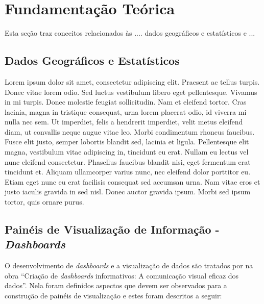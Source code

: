 \label{cap:revisao}

\section{Fundamentação Teórica} \textbf{ }

    Esta seção traz conceitos relacionados às .... dados geográficos e estatísticos e ...
    
    \subsection{Dados Geográficos e Estatísticos} \textbf{ } \newline

        Lorem ipsum dolor sit amet, consectetur adipiscing elit. Praesent ac tellus turpis. Donec vitae lorem odio. Sed luctus vestibulum libero eget pellentesque. Vivamus in mi turpis. Donec molestie feugiat sollicitudin. Nam et eleifend tortor. Cras lacinia, magna in tristique consequat, urna lorem placerat odio, id viverra mi nulla nec sem. Ut imperdiet, felis a hendrerit imperdiet, velit metus eleifend diam, ut convallis neque augue vitae leo. Morbi condimentum rhoncus faucibus. Fusce elit justo, semper lobortis blandit sed, lacinia et ligula. Pellentesque elit magna, vestibulum vitae adipiscing in, tincidunt eu erat. Nullam eu lectus vel nunc eleifend consectetur. Phasellus faucibus blandit nisi, eget fermentum erat tincidunt et. Aliquam ullamcorper varius nunc, nec eleifend dolor porttitor eu. Etiam eget nunc eu erat facilisis consequat sed accumsan urna. Nam vitae eros et justo iaculis gravida in sed nisl. Donec auctor gravida ipsum. Morbi sed ipsum tortor, quis ornare purus.
        
    \subsection{Painéis de Visualização de Informação - \textit{Dashboards}} \textbf{ } 

        O desenvolvimento de \textit{dashboards} e a visualização de dados são tratados por  na obra ``Criação de \textit{dashboards} informativos: A comunicação visual eficaz dos dados''. Nela foram definidos aspectos que devem ser observados para a construção de painéis de visualização e estes foram descritos a seguir:

